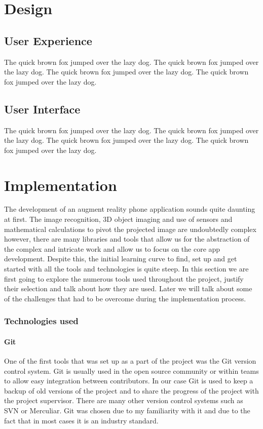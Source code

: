 \documentclass{l4proj}
\begin{document}
\chapter{Design}
\section{User Experience}
The quick brown fox jumped over the lazy dog.
The quick brown fox jumped over the lazy dog.
The quick brown fox jumped over the lazy dog.
The quick brown fox jumped over the lazy dog.
\section{User Interface}
The quick brown fox jumped over the lazy dog.
The quick brown fox jumped over the lazy dog.
The quick brown fox jumped over the lazy dog.
The quick brown fox jumped over the lazy dog.

\chapter{Implementation}
The development of an augment reality phone application sounds quite daunting at first. The image recognition, 3D object imaging and use of sensors and mathematical calculations to pivot the projected image are undoubtedly complex however, there are many libraries and tools that allow us for the abstraction of the complex and intricate work and allow us to focus on the core app development. Despite this, the initial learning curve to find, set up and get started with all the tools and technologies is quite steep. In this section we are first going to explore the numerous tools used throughout the project, justify their selection and talk about how they are used. Later we will talk about some of the challenges that had to be overcome during the implementation process. 
\subsection{Technologies used}
\subsubsection{Git}
One of the first tools that was set up as a part of the project was the Git version control system. Git is usually used in the open source community or within teams to allow easy integration between contributors. In our case Git is used to keep a backup of old versions of the project and to share the progress of the project with the project supervisor. There are many other version control systems such as SVN or Merculiar. Git was chosen due to my familiarity with it and due to the fact that in most cases it is an industry standard.
	
\end{document}
